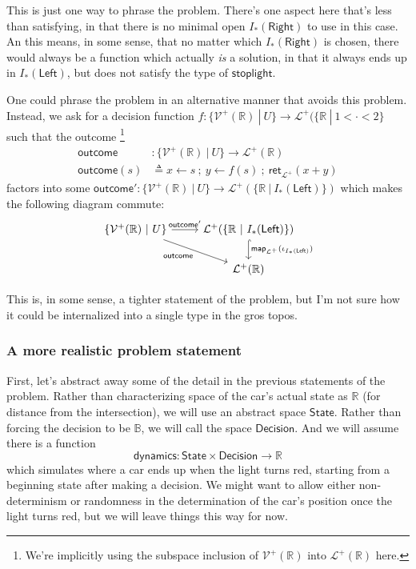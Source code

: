 \documentclass{article}           %
\newcommand{\R}{\mathbb{R}}
\newcommand{\suchthat}{\ |\ }
\newcommand{\bool}{\mathbb{B}}
\newcommand{\PLower}{\mathcal{L}^+}
\newcommand{\Viet}{{\mathcal{V}^+}}
\newcommand{\ret}[1]{\mathsf{ret}_{#1}}
\newcommand{\then}{\ ;\ }
\begin{document}
This is just one way to phrase the problem. There's one aspect here that's less than satisfying, in that there is no minimal open $I_*(\mathsf{Right})$ to use in this case. An this means, in some sense, that no matter which $I_*(\mathsf{Right})$ is chosen, there would always be a function which actually \emph{is} a solution, in that it always ends up in $I_*(\mathsf{Left})$, but does not satisfy the type of $\mathsf{stoplight}$. 

One could phrase the problem in an alternative manner that avoids this problem. Instead, we ask for a decision function $f :  \{ \Viet(\R) \suchthat U \} \to \PLower(\{ \R \suchthat 1 < \cdot < 2 \}$ such that the outcome \footnote{We're implicitly using the subspace inclusion of $\Viet(\R)$ into $\PLower(\R)$ here.}
\begin{align*}
\mathsf{outcome} &: \{ \Viet(\R) \suchthat U \} \to \PLower(\R)
\\ \mathsf{outcome}(s) &\triangleq 
  x \leftarrow s \then 
  y \leftarrow f(s) \then
  \ret{\PLower}(x + y)
\end{align*}
factors into some $\mathsf{outcome'} : \{ \Viet(\R) \suchthat U \} \to \PLower(\{\R \suchthat I_*(\mathsf{Left})\})$ which makes the following diagram commute:
\begin{equation*}
\begin{tikzcd}
\{ \Viet(\R) \suchthat U \} \arrow[r, "\mathsf{outcome'}"]
   \arrow[dr,swap,"\mathsf{outcome}"]
& \PLower(\{\R \suchthat I_*(\mathsf{Left})\})
   \arrow[d, hook, "\mathsf{map}_{\PLower}(\iota_{I_*(\mathsf{Left})})"]
\\
{} & \PLower(\R)
\end{tikzcd}
\end{equation*}

This is, in some sense, a tighter statement of the problem, but I'm not sure how it could be internalized into a single type in the gros topos. 
\subsubsection{A more realistic problem statement}

First, let's abstract away some of the detail in the previous statements of the problem. Rather than characterizing space of the car's actual state as $\R$ (for distance from the intersection), we will use an abstract space $\mathsf{State}$. Rather than forcing the decision to be $\bool$, we will call the space $\mathsf{Decision}$. And we will assume there is a function
\[
\mathsf{dynamics} : \mathsf{State} \times \mathsf{Decision} \to \R
\]
which simulates where a car ends up when the light turns red, starting from a beginning state after making a decision. We might want to allow either non-determinism or randomness in the determination of the car's position once the light turns red, but we will leave things this way for now.
\end{document}
